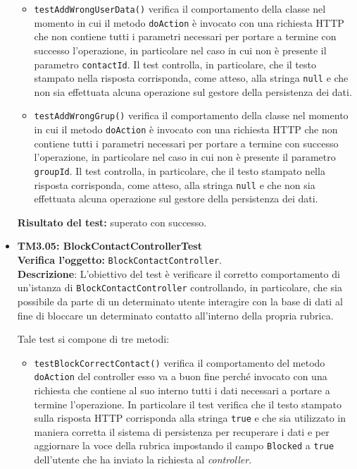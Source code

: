 \begin{itemize}
\begin{itemize}
\item \texttt{testAddWrongUserData()} verifica il comportamento della classe nel momento in cui il metodo \texttt{doAction} è invocato con una richiesta HTTP che non contiene tutti i parametri necessari per portare a termine con successo l'operazione, in particolare nel caso in cui non è presente il parametro \texttt{contactId}. Il test controlla, in particolare, che il testo stampato nella risposta corrisponda, come atteso, alla stringa \texttt{null} e che non sia effettuata alcuna operazione sul gestore della persistenza dei dati.

\item \texttt{testAddWrongGrup()} verifica il comportamento della classe nel momento in cui il metodo \texttt{doAction} è invocato con una richiesta HTTP che non contiene tutti i parametri necessari per portare a termine con successo l'operazione, in particolare nel caso in cui non è presente il parametro \texttt{groupId}. Il test controlla, in particolare, che il testo stampato nella risposta corrisponda, come atteso, alla stringa \texttt{null} e che non sia effettuata alcuna operazione sul gestore della persistenza dei dati.

\end{itemize}
\textbf{Risultato del test:} superato con successo.


\item[\passed] \textbf{TM3.05: BlockContactControllerTest}\\
\textbf{Verifica l'oggetto:} \texttt{BlockContactController}.\\
\textbf{Descrizione}: L'obiettivo del test è verificare il corretto comportamento di un'istanza di \texttt{BlockContactController} controllando, in particolare, che sia possibile da parte di un determinato utente interagire con la base di dati al fine di bloccare un determinato contatto all'interno della propria rubrica.

Tale test si compone di tre metodi: 

\begin{itemize}
\item \texttt{testBlockCorrectContact()} verifica il comportamento del metodo \texttt{doAction} del controller esso va a buon fine perché invocato con una richiesta che contiene al suo interno tutti i dati necessari a portare a termine l'operazione. In particolare il test verifica che il testo stampato sulla risposta HTTP corrisponda alla stringa \texttt{true} e che sia utilizzato in maniera corretta il sistema di persistenza per recuperare i dati e per aggiornare la voce della rubrica impostando il campo \texttt{Blocked} a \texttt{true} dell'utente che ha inviato la richiesta al \textit{controller}.


\end{itemize}
\end{itemize}
